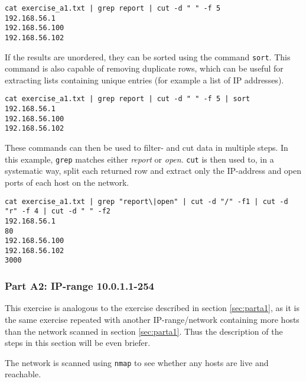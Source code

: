 \begin{lstlisting}[numbers=none, language={}, frame=single, framexleftmargin={0.2em}]
cat exercise_a1.txt | grep report | cut -d " " -f 5
192.168.56.1
192.168.56.100
192.168.56.102
\end{lstlisting}

If the results are unordered, they can be sorted using the command
\texttt{sort}. This command is also capable of removing duplicate
rows, which can be useful for extracting lists containing unique
entries (for example a list of IP addresses).

\begin{lstlisting}[numbers=none, language={}, frame=single, framexleftmargin={0.2em}]
cat exercise_a1.txt | grep report | cut -d " " -f 5 | sort
192.168.56.1
192.168.56.100
192.168.56.102
\end{lstlisting}

\pagebreak
These commands can then be used to filter- and cut data in multiple steps.
In this example, \texttt{grep} matches either \textit{report} or \textit{open}.
\texttt{cut} is then used to, in a systematic way, split each returned row and extract
only the IP-address and open ports of each host on the network.

\begin{lstlisting}[numbers=none, language={}, frame=single, framexleftmargin={0.2em}]
cat exercise_a1.txt | grep "report\|open" | cut -d "/" -f1 | cut -d "r" -f 4 | cut -d " " -f2
192.168.56.1
80
192.168.56.100
192.168.56.102
3000
\end{lstlisting}

\subsubsection{Part A2: IP-range 10.0.1.1-254}
This exercise is analogous to the exercise described in section \ref{sec:parta1},
as it is the same exercise repeated with another IP-range/network containing
more hosts than the network scanned in section \ref{sec:parta1}. Thus the description of
the steps in this section will be even briefer.

The network is scanned using \texttt{nmap} to see whether any hosts are
live and reachable.

